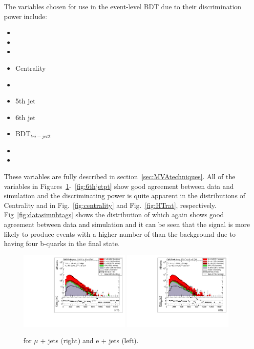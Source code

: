 The variables chosen for use in the event-level BDT due to their discrimination power include:
\begin{multicols}{2}
\begin{itemize}
\item \njets
\item \nMtags
\item \HTb
\item Centrality
\item \HTrat
\item 5th jet \pt
\item 6th jet \pt
\item BDT$_{tri-jet2}$
\item \sumjetmassX
\item \HTX
\end{itemize}
\end{multicols}
These variables are fully described in section~\ref{sec:MVAtechniques}. All of the variables in Figures~\ref{fig:HTb}-~\ref{fig:6thjetpt} show good agreement between data and simulation and the discriminating power is quite apparent in the distributions of Centrality and \HTrat in Fig.~\ref{fig:centrality} and Fig.~\ref{fig:HTrat}, respectively. Fig~\ref{fig:datasimnbtags} shows the distribution of \nMtags which again shows good agreement between data and simulation and it can be seen that the \tttt signal is more likely to produce events with a higher number of \nMtags than the background due to having four b-quarks in the final state.


\begin{figure}[!ht]
    \includegraphics[width=0.49\textwidth]{images/Run1/HTb_SelectedJets_StackLogY_Mu.pdf}
    \includegraphics[width=0.49\textwidth]{images/Run1/HTb_SelectedJets_StackLogY_e.pdf}
    \caption{\HTb for $\mu$ + jets (right) and e + jets (left).}
    \label{fig:HTb}
\end{figure}

